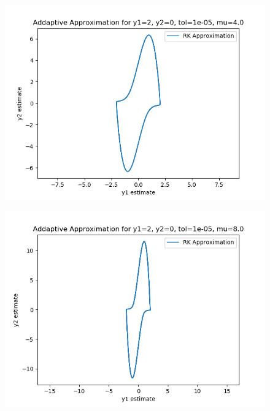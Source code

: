 \documentclass{article}
\begin{document}
\begin{itemize}
\begin{figure}[H]
			\includegraphics[scale=0.6]{adapt_vdp4}
		\end{figure}
		\begin{figure}[H]
			\includegraphics[scale=0.6]{adapt_vdp8}
		\end{figure}


\end{itemize}
\end{document}
